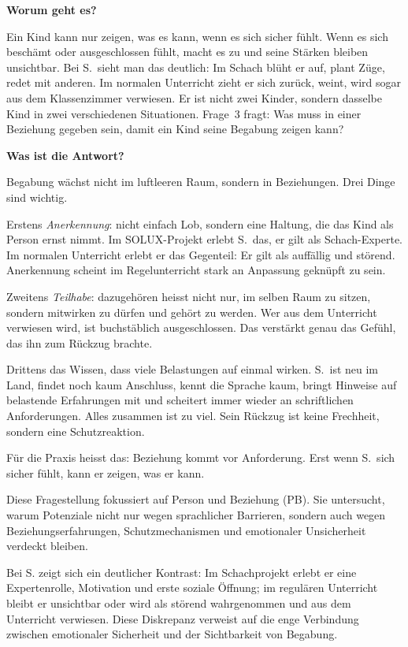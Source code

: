 \documentclass[ngerman, a4paper]{article}
\begin{document}
\begin{frageantwort3}
  \textbf{Worum geht es?}

  Ein Kind kann nur zeigen, was es kann, wenn es sich sicher fühlt. Wenn
  es sich beschämt oder ausgeschlossen fühlt, macht es zu und seine
  Stärken bleiben unsichtbar. Bei S.~sieht man das deutlich: Im Schach
  blüht er auf, plant Züge, redet mit anderen. Im normalen Unterricht
  zieht er sich zurück, weint, wird sogar aus dem Klassenzimmer verwiesen.
  Er ist nicht zwei Kinder, sondern dasselbe Kind in zwei verschiedenen
  Situationen. Frage~3 fragt: Was muss in einer Beziehung gegeben sein,
  damit ein Kind seine Begabung zeigen kann?

  \medskip
  \textbf{Was ist die Antwort?}

  Begabung wächst nicht im luftleeren Raum, sondern in Beziehungen. Drei
  Dinge sind wichtig.

  Erstens \emph{Anerkennung}: nicht einfach Lob, sondern eine Haltung,
  die das Kind als Person ernst nimmt. Im SOLUX-Projekt erlebt S.~das,
  er gilt als Schach-Experte. Im normalen Unterricht erlebt er das
  Gegenteil: Er gilt als auffällig und störend. Anerkennung scheint im
  Regelunterricht stark an Anpassung geknüpft zu sein.

  Zweitens \emph{Teilhabe}: dazugehören heisst nicht nur, im selben Raum
  zu sitzen, sondern mitwirken zu dürfen und gehört zu werden. Wer aus
  dem Unterricht verwiesen wird, ist buchstäblich ausgeschlossen. Das
  verstärkt genau das Gefühl, das ihn zum Rückzug brachte.

  Drittens das Wissen, dass viele Belastungen auf einmal wirken. S.~ist
  neu im Land, findet noch kaum Anschluss, kennt die Sprache kaum,
  bringt Hinweise auf belastende Erfahrungen mit und scheitert
  immer wieder an schriftlichen Anforderungen. Alles
  zusammen ist zu viel. Sein Rückzug ist keine Frechheit, sondern eine
  Schutzreaktion.

  Für die Praxis heisst das: Beziehung kommt vor Anforderung. Erst wenn
  S.~sich sicher fühlt, kann er zeigen, was er kann.
\end{frageantwort3}


Diese Fragestellung fokussiert auf Person und Beziehung (PB). Sie untersucht, warum
Potenziale nicht nur wegen sprachlicher Barrieren, sondern auch wegen
Beziehungserfahrungen, Schutzmechanismen und emotionaler Unsicherheit verdeckt bleiben.

Bei S. zeigt sich ein deutlicher Kontrast: Im Schachprojekt erlebt er eine Expertenrolle,
Motivation und erste soziale Öffnung; im regulären Unterricht bleibt er unsichtbar oder
wird als störend wahrgenommen und aus dem Unterricht verwiesen. Diese Diskrepanz
verweist auf die enge Verbindung zwischen emotionaler Sicherheit und der Sichtbarkeit
von Begabung.
\end{document}
